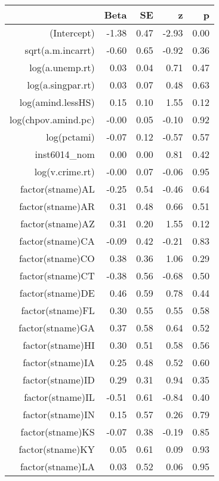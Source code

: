 \begin{table}[ht]
\centering
\begin{tabular}{rrrrr}
  \hline
 & Beta & SE & z & p \\ 
  \hline
(Intercept) & -1.38 & 0.47 & -2.93 & 0.00 \\ 
  sqrt(a.m.incarrt) & -0.60 & 0.65 & -0.92 & 0.36 \\ 
  log(a.unemp.rt) & 0.03 & 0.04 & 0.71 & 0.47 \\ 
  log(a.singpar.rt) & 0.03 & 0.07 & 0.48 & 0.63 \\ 
  log(amind.lessHS) & 0.15 & 0.10 & 1.55 & 0.12 \\ 
  log(chpov.amind.pc) & -0.00 & 0.05 & -0.10 & 0.92 \\ 
  log(pctami) & -0.07 & 0.12 & -0.57 & 0.57 \\ 
  inst6014\_nom & 0.00 & 0.00 & 0.81 & 0.42 \\ 
  log(v.crime.rt) & -0.00 & 0.07 & -0.06 & 0.95 \\ 
  factor(stname)AL & -0.25 & 0.54 & -0.46 & 0.64 \\ 
  factor(stname)AR & 0.31 & 0.48 & 0.66 & 0.51 \\ 
  factor(stname)AZ & 0.31 & 0.20 & 1.55 & 0.12 \\ 
  factor(stname)CA & -0.09 & 0.42 & -0.21 & 0.83 \\ 
  factor(stname)CO & 0.38 & 0.36 & 1.06 & 0.29 \\ 
  factor(stname)CT & -0.38 & 0.56 & -0.68 & 0.50 \\ 
  factor(stname)DE & 0.46 & 0.59 & 0.78 & 0.44 \\ 
  factor(stname)FL & 0.30 & 0.55 & 0.55 & 0.58 \\ 
  factor(stname)GA & 0.37 & 0.58 & 0.64 & 0.52 \\ 
  factor(stname)HI & 0.30 & 0.51 & 0.58 & 0.56 \\ 
  factor(stname)IA & 0.25 & 0.48 & 0.52 & 0.60 \\ 
  factor(stname)ID & 0.29 & 0.31 & 0.94 & 0.35 \\ 
  factor(stname)IL & -0.51 & 0.61 & -0.84 & 0.40 \\ 
  factor(stname)IN & 0.15 & 0.57 & 0.26 & 0.79 \\ 
  factor(stname)KS & -0.07 & 0.38 & -0.19 & 0.85 \\ 
  factor(stname)KY & 0.05 & 0.61 & 0.09 & 0.93 \\ 
  factor(stname)LA & 0.03 & 0.52 & 0.06 & 0.95 \\ 

\end{tabular}
\end{table}
